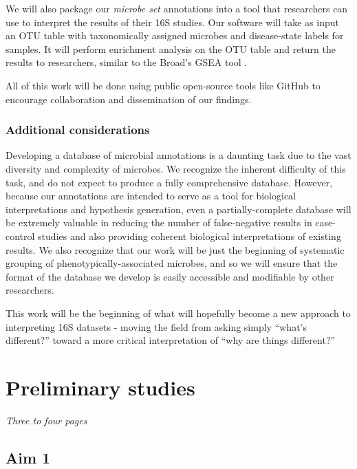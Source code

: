 \documentclass[12pt]{article}
\begin{document}
We will also package our \textit{microbe set} annotations into a tool 
that researchers can use to interpret the results of their 16S 
studies. Our software will take as input an OTU table with 
taxonomically assigned microbes and disease-state labels for samples. 
It will perform enrichment analysis on the OTU table and return the 
results to researchers, similar to the Broad's GSEA tool \cite{subramanian-gsea-2005}.

All of this work will be done using public open-source tools like 
GitHub to encourage collaboration and dissemination of our findings.

\subsubsection{Additional considerations}
Developing a database of microbial annotations is a daunting task due 
to the vast diversity and complexity of microbes. We recognize the 
inherent difficulty of this task, and do not expect to produce a fully 
comprehensive database. However, because our annotations are intended 
to serve as a tool for biological interpretations and hypothesis 
generation, even a partially-complete database will be extremely 
valuable in reducing the number of false-negative results in case-
control studies and also providing coherent biological interpretations 
of existing results. We also recognize that our work will be just the 
beginning of systematic grouping of phenotypically-associated 
microbes, and so we will ensure that the format of the database we 
develop is easily accessible and modifiable by other researchers.

This work will be the beginning of what will hopefully become a new 
approach to interpreting 16S datasets - moving the field from asking 
simply ``what's different?'' toward a more critical interpretation of 
``why are things different?''

\section{Preliminary studies}
\textit{Three to four pages}

\subsection{Aim 1}
\end{document}
